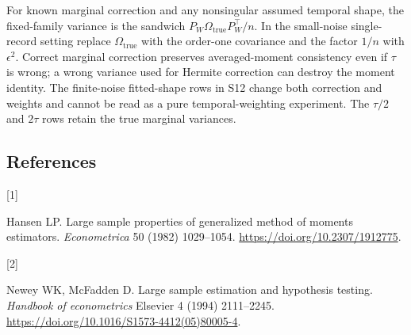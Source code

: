 \documentclass[
  11pt,
]{article}
\newlength{\cslhangindent}
\newlength{\csllabelwidth}
\newenvironment{CSLReferences}[2] %
 {\begin{list}{}{%
  \setlength{\itemindent}{0pt}
  \setlength{\leftmargin}{0pt}
  \setlength{\parsep}{0pt}
  \ifodd #1
   \setlength{\leftmargin}{\cslhangindent}
   \setlength{\itemindent}{-1\cslhangindent}
  \fi
  \setlength{\itemsep}{#2\baselineskip}}}
 {\end{list}}
\newcommand{\CSLLeftMargin}[1]{\parbox[t]{\csllabelwidth}{\strut#1\strut}}
\newcommand{\CSLRightInline}[1]{\parbox[t]{\linewidth - \csllabelwidth}{\strut#1\strut}}
\begin{document}
For known marginal correction and any nonsingular assumed temporal
shape, the fixed-family variance is the sandwich
\(P_W\Omega_{\mathrm{true}}P_W^\top/n\). In the small-noise
single-record setting replace \(\Omega_{\mathrm{true}}\) with the
order-one covariance and the factor \(1/n\) with \(\epsilon^2\). Correct
marginal correction preserves averaged-moment consistency even if
\(\tau\) is wrong; a wrong variance used for Hermite correction can
destroy the moment identity. The finite-noise fitted-shape rows in S12
change both correction and weights and cannot be read as a pure
temporal-weighting experiment. The \(\tau/2\) and \(2\tau\) rows retain
the true marginal variances.

\subsection*{References}\label{references}

\protect{}\label{refs}
\begin{CSLReferences}{0}{0}
\CSLLeftMargin{{[}1{]} }%
\CSLRightInline{Hansen LP. Large sample properties of generalized method
of moments estimators. \emph{Econometrica} 50 (1982) 1029--1054.
\url{https://doi.org/10.2307/1912775}.}

\CSLLeftMargin{{[}2{]} }%
\CSLRightInline{Newey WK, McFadden D. Large sample estimation and
hypothesis testing. \emph{Handbook of econometrics} Elsevier 4 (1994)
2111--2245. \url{https://doi.org/10.1016/S1573-4412(05)80005-4}.}

\end{CSLReferences}
\end{document}
